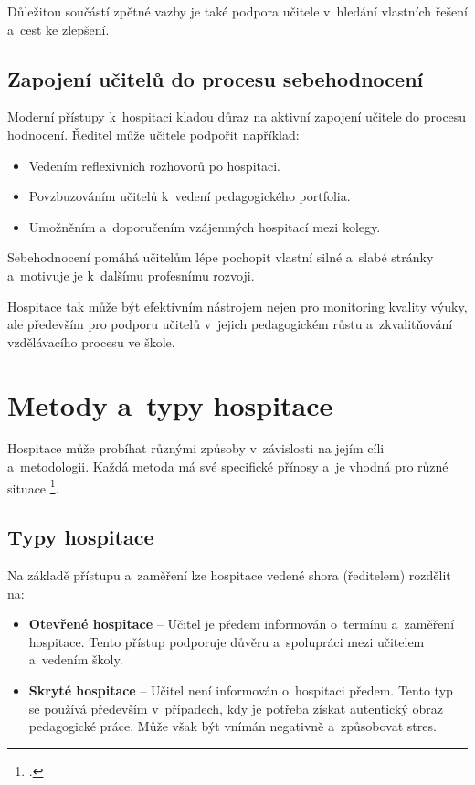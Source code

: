Důležitou součástí zpětné vazby je také podpora učitele v~hledání vlastních řešení a~cest ke zlepšení.

\subsection{Zapojení učitelů do procesu sebehodnocení}
Moderní přístupy k~hospitaci kladou důraz na aktivní zapojení učitele do procesu hodnocení. Ředitel může učitele podpořit například:

\begin{itemize}
    \item Vedením reflexivních rozhovorů po hospitaci.
    \item Povzbuzováním učitelů k~vedení pedagogického portfolia.
    \item Umožněním a~doporučením vzájemných hospitací mezi kolegy.
\end{itemize}

Sebehodnocení pomáhá učitelům lépe pochopit vlastní silné a~slabé stránky a~motivuje je k~dalšímu profesnímu rozvoji.

Hospitace tak může být efektivním nástrojem nejen pro monitoring kvality výuky, ale především pro podporu učitelů v~jejich pedagogickém růstu a~zkvalitňování vzdělávacího procesu ve škole.



\section{Metody a~typy hospitace}

Hospitace může probíhat různými způsoby v~závislosti na jejím cíli a~metodologii. Každá metoda má své specifické přínosy a~je vhodná pro různé situace \footcite[122]{ped-proces-rizeni}.

\subsection{Typy hospitace}

Na základě přístupu a~zaměření lze hospitace vedené shora (ředitelem) rozdělit na:

\begin{itemize}
    \item \textbf{Otevřené hospitace} – Učitel je předem informován o~termínu a~zaměření hospitace. Tento přístup podporuje důvěru a~spolupráci mezi učitelem a~vedením školy.
    \item \textbf{Skryté hospitace} – Učitel není informován o~hospitaci předem. Tento typ se používá především v~případech, kdy je potřeba získat autentický obraz pedagogické práce. Může však být vnímán negativně a~způsobovat stres.
\end{itemize}

